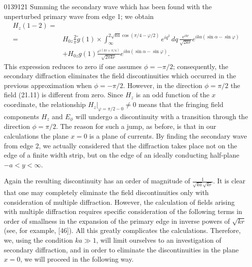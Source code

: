 \begin{scanpage}{0139}{121}
Summing the secondary wave which has been found with the unperturbed primary wave from edge 1; we obtain
\[
\begin{aligned}
H_z(1-2)={}&\\
={}&H_{0z}\frac2\pi\widetilde g(1)\times\int_\infty^{2\sqrt{ka}\cos(\pi/4-\varphi/2)}e^{iq^2}\,dq\,\frac{e^{ikr}}{\sqrt{2kr}}e^{ika(\sin\alpha-\sin\varphi)}\\
&+H_{0z}g(1)\frac{e^{i(kr+\pi/4)}}{\sqrt{2\pi kr}}e^{ika(\sin\alpha-\sin\varphi)}.
\end{aligned}\tag{21.11}
\]
This expression reduces to zero if one assumes $\phi=-\pi/2$; consequently, the secondary diffraction eliminates the field discontinuities which occurred in the previous approximation when $\phi=-\pi/2$. However, in the direction $\phi=\pi/2$ the field (21.11) is different from zero. Since $H_z$ is an odd function of the $x$ coordinate, the relationship $H_z|_{\varphi=\pi/2-0}\ne0$ means that the fringing field components $H_z$ and $E_\phi$ will undergo a discontinuity with a transition through the direction $\phi=\pi/2$. The reason for such a jump, as before, is that in our calculations the plane $x=0$ is a plane of currents. By finding the secondary wave from edge 2, we actually considered that the diffraction takes place not on the edge of a finite width strip, but on the edge of an ideally conducting half-plane $-a<y<\infty$.

Again the resulting discontinuity has an order of magnitude of $\frac1{\sqrt{ka}\sqrt{kr}}$. It is clear that one may completely eliminate the field discontinuities only with consideration of multiple diffraction. However, the calculation of fields arising with multiple diffraction requires specific consideration of the following terms in order of smallness in the expansion of the primary edge in inverse powers of $\sqrt{kr}$ (see, for example, [46]). All this greatly complicates the calculations. Therefore, we, using the condition $ka\gg1$, will limit ourselves to an investigation of secondary diffraction, and in order to eliminate the discontinuities in the plane $x=0$, we will proceed in the following way.
\end{scanpage}
